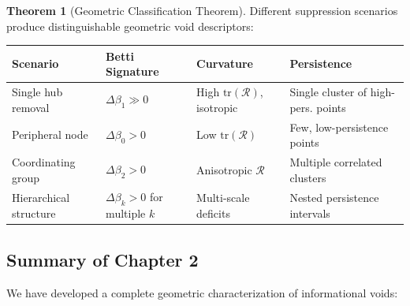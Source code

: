 \documentclass[12pt,a4paper]{article}
\theoremstyle{definition}
\newtheorem{theorem}{Theorem}[section]
\theoremstyle{remark}
\begin{document}
\begin{theorem}[Geometric Classification Theorem]
\label{thm:classification}
Different suppression scenarios produce distinguishable geometric void descriptors:

\begin{center}
\renewcommand{\arraystretch}{1.4}
\begin{tabular}{p{2.5cm}p{2.8cm}p{2.8cm}p{3.5cm}}
\toprule
\textbf{Scenario} & \textbf{Betti Signature} & \textbf{Curvature} & \textbf{Persistence} \\
\midrule
Single hub removal & $\Delta\beta_1 \gg 0$ & High $\text{tr}(\mathcal{R})$, isotropic & Single cluster of high-pers. points \\
\addlinespace
Peripheral node & $\Delta\beta_0 > 0$ & Low $\text{tr}(\mathcal{R})$ & Few, low-persistence points \\
\addlinespace
Coordinating group & $\Delta\beta_2 > 0$ & Anisotropic $\mathcal{R}$ & Multiple correlated clusters \\
\addlinespace
Hierarchical structure & $\Delta\beta_k > 0$ for multiple $k$ & Multi-scale deficits & Nested persistence intervals \\
\bottomrule
\end{tabular}
\end{center}
\end{theorem}

\subsection{Summary of Chapter 2}

We have developed a complete geometric characterization of informational voids:
\end{document}
